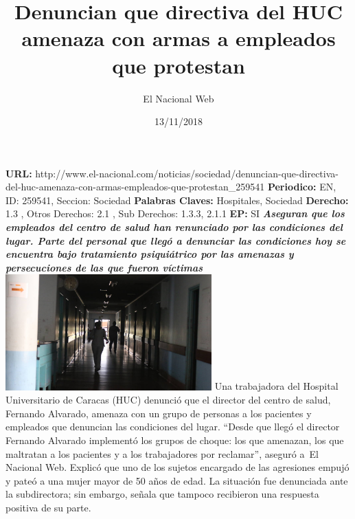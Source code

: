 \documentclass{article}%
\title{\textbf{Denuncian que directiva del HUC amenaza con armas a empleados que protestan}}%
\author{El Nacional Web}%
\date{13/11/2018}%
\begin{document}
%
\normalsize%
\maketitle%
\textbf{URL: }%
http://www.el{-}nacional.com/noticias/sociedad/denuncian{-}que{-}directiva{-}del{-}huc{-}amenaza{-}con{-}armas{-}empleados{-}que{-}protestan\_259541\newline%
%
\textbf{Periodico: }%
EN, %
ID: %
259541, %
Seccion: %
Sociedad\newline%
%
\textbf{Palabras Claves: }%
Hospitales, Sociedad\newline%
%
\textbf{Derecho: }%
1.3%
, Otros Derechos: %
2.1%
, Sub Derechos: %
1.3.3, 2.1.1%
\newline%
%
\textbf{EP: }%
SI\newline%
\newline%
%
\textbf{\textit{Aseguran que los empleados del centro de salud han renunciado por las condiciones del lugar. Parte del personal que llegó a denunciar las condiciones hoy se encuentra bajo tratamiento psiquiátrico por las amenazas y persecuciones de las que fueron víctimas}}%
\newline%
\newline%
%
\includegraphics[width=300px]{135.jpg}%
\newline%
%
Una trabajadora del Hospital Universitario de Caracas (HUC) denunció que el director del centro de salud, Fernando Alvarado, amenaza con un grupo de personas a los pacientes y empleados que denuncian las condiciones del lugar.%
\newline%
%
“Desde que llegó el director Fernando Alvarado implementó los grupos de choque: los que amenazan, los que maltratan a los pacientes y a los trabajadores por reclamar”, aseguró a~El Nacional Web.%
\newline%
%
Explicó que uno de los sujetos encargado de las agresiones empujó y pateó a una mujer mayor de 50 años de edad. La situación fue denunciada ante la subdirectora; sin embargo, señala que tampoco recibieron una respuesta positiva de su parte.%
\newline%
\end{document}
